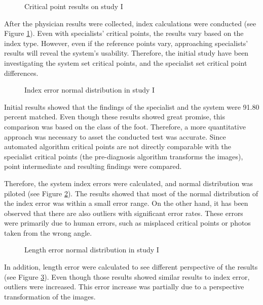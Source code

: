 \begin{figure}[htbp]
\centering
{}
\caption{Critical point results on study I}
\label{fig:StudyICriticalPointResult}
\end{figure}

After the physician results were collected, index calculations were conducted (see Figure  \ref{fig:StudyICriticalPointResult}). Even with specialists' critical points, the results vary based on the index type. However, even if the reference points vary, approaching specialists’ results will reveal the system's usability. Therefore, the initial study have been investigating the system set critical points, and the specialist set critical point differences.

\begin{figure}[htbp]
\centering
{}
\caption{Index error normal distribution in study I}
\label{fig:StudyIIndexErrorNormalDists}
\end{figure}

Initial results showed that the findings of the specialist and the system were 91.80 percent matched. Even though these results showed great promise, this comparison was based on the class of the foot. Therefore, a more quantitative approach was necessary to asset the conducted test was accurate. Since automated algorithm critical points are not directly comparable with the specialist critical points (the pre-diagnosis algorithm transforms the images), point intermediate and resulting findings were compared.

Therefore, the system index errors were calculated, and normal distribution was piloted (see Figure \ref{fig:StudyIIndexErrorNormalDists}). The results showed that most of the normal distribution of the index error was within a small error range. On the other hand, it has been observed that there are also outliers with significant error rates. These errors were primarily due to human errors, such as misplaced critical points or photos taken from the wrong angle. 

\begin{figure}[htbp]
\centering
{}
\caption{Length error normal distribution in study I}
\label{fig:StudyILenghtErrorNormalDists}
\end{figure}

In addition, length error were calculated to see different perspective of the results (see Figure \ref{fig:StudyILenghtErrorNormalDists}). Even though those results showed similar results to index error, outliers were increased. This error increase was partially due to a perspective transformation of the images.
